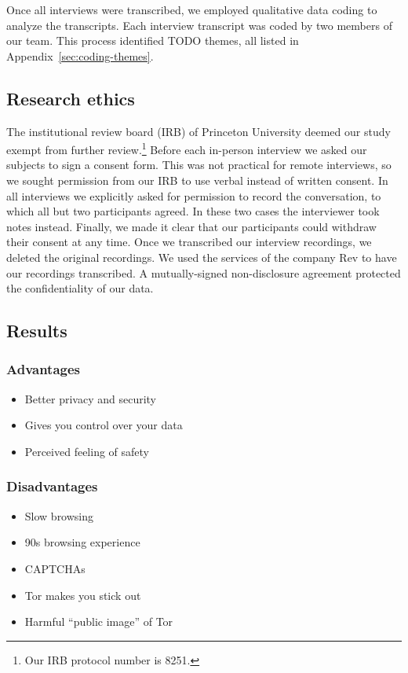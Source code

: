 Once all interviews were transcribed, we employed qualitative data coding to
analyze the transcripts.  Each interview transcript was coded by two members of
our team.  This process identified TODO themes, all listed in
Appendix~\ref{sec:coding-themes}.

\subsection{Research ethics}

The institutional review board (IRB) of Princeton University deemed our study
exempt from further review.\footnote{Our IRB protocol number is 8251.}  Before
each in-person interview we asked our subjects to sign a consent form.  This
was not practical for remote interviews, so we sought permission from our IRB
to use verbal instead of written consent.  In all interviews we explicitly
asked for permission to record the conversation, to which all but two
participants agreed.  In these two cases the interviewer took notes instead.
Finally, we made it clear that our participants could withdraw their consent at
any time.  Once we transcribed our interview recordings, we deleted the
original recordings.  We used the services of the company Rev to have our
recordings transcribed.  A mutually-signed non-disclosure agreement protected
the confidentiality of our data.

\subsection{Results}

\subsubsection{Advantages}

\begin{itemize}
    \item Better privacy and security
    \item Gives you control over your data
    \item Perceived feeling of safety
\end{itemize}

\subsubsection{Disadvantages}

\begin{itemize}
    \item Slow browsing
    \item 90s browsing experience
    \item CAPTCHAs
    \item Tor makes you stick out
    \item Harmful ``public image'' of Tor
\end{itemize}

